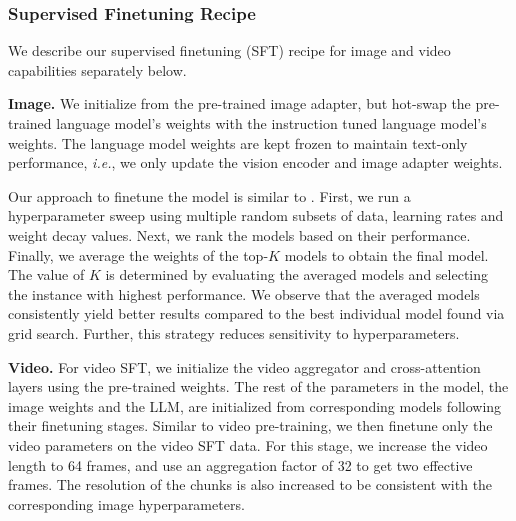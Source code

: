 \subsubsection{Supervised Finetuning Recipe}
We describe our supervised finetuning (SFT) recipe for image and video capabilities separately below.

\label{subsubsection:vision_supervised_finetuning_recipe}
\textbf{Image.} We initialize from the pre-trained image adapter, but hot-swap the pre-trained language model's weights with the instruction tuned language model's weights. The language model weights are kept frozen to maintain text-only performance, \textit{i.e.}, we only update the vision encoder and image adapter weights.

Our approach to finetune the model is similar to \cite{wortsman2022modelsoupsaveragingweights}. First, we run a hyperparameter sweep using multiple random subsets of data, learning rates and weight decay values. Next, we rank the models based on their performance. Finally, we average the weights of the top-$K$ models to obtain the final model. The value of $K$ is determined by evaluating the averaged models and selecting the instance with highest performance. We observe that the averaged models consistently yield better results compared to the best individual model found via grid search. Further, this strategy reduces sensitivity to hyperparameters.

\textbf{Video.} For video SFT, we initialize the video aggregator and cross-attention layers using the pre-trained weights.
The rest of the parameters in the model, the image weights and the LLM, are initialized from corresponding models following their finetuning stages.
Similar to video pre-training, we then finetune only the video parameters on the video SFT data.
For this stage, we increase the video length to 64 frames, and use an aggregation factor of 32 to get two effective frames.
The resolution of the chunks is also increased to be consistent with the corresponding image hyperparameters.

